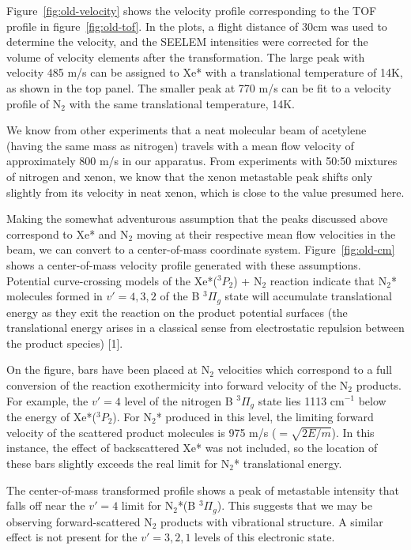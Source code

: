 \documentclass[12pt]{mitthesis}
\begin{document}
Figure~\ref{fig:old-velocity} shows the velocity profile corresponding
to the TOF profile in figure~\ref{fig:old-tof}.  In the plots, a
flight distance of 30cm was used to determine the velocity, and the
SEELEM intensities were corrected for the volume of velocity elements
after the transformation.  The large peak with velocity 485 m/s can be
assigned to Xe* with a translational temperature of 14K, as shown in
the top panel.  The smaller peak at 770 m/s can be fit to a velocity
profile of N$_2$ with the same translational temperature, 14K.

We know from other experiments that a neat molecular beam of acetylene
(having the same mass as nitrogen) travels with a mean flow velocity
of approximately 800 m/s in our apparatus.  From experiments with
50:50 mixtures of nitrogen and xenon, we know that the xenon
metastable peak shifts only slightly from its velocity in neat xenon,
which is close to the value presumed here.

Making the somewhat adventurous assumption that the peaks discussed
above correspond to Xe* and N$_2$ moving at their respective mean flow
velocities in the beam, we can convert to a center-of-mass coordinate
system.  Figure~\ref{fig:old-cm} shows a center-of-mass velocity
profile generated with these assumptions.  Potential curve-crossing
models of the Xe*($^3P_2$) + N$_2$ reaction indicate that N$_2$*
molecules formed in $v'=4,3,2$ of the B $^3\Pi_g$ state will accumulate
translational energy as they exit the reaction on the product
potential surfaces (the translational energy arises in a classical
sense from electrostatic repulsion between the product species) [1].

On the figure, bars have been placed at N$_2$ velocities which
correspond to a full conversion of the reaction exothermicity into
forward velocity of the N$_2$ products.  For example, the $v'=4$ level
of the nitrogen B $^3\Pi_g$ state lies 1113 cm$^{-1}$ below the energy
of Xe*($^3P_2$).  For N$_2$* produced in this level, the limiting
forward velocity of the scattered product molecules is 975 m/s
($=\sqrt{2E/m}$).  In this instance, the effect of backscattered Xe*
was not included, so the location of these bars slightly exceeds the
real limit for N$_2$* translational energy.

The center-of-mass transformed profile shows a peak of metastable
intensity that falls off near the $v'=4$ limit for N$_2$*(B $^3\Pi_g$).
This suggests that we may be observing forward-scattered N$_2$
products with vibrational structure.  A similar effect is not present
for the $v'=3,2,1$ levels of this electronic state.  
\end{document}

